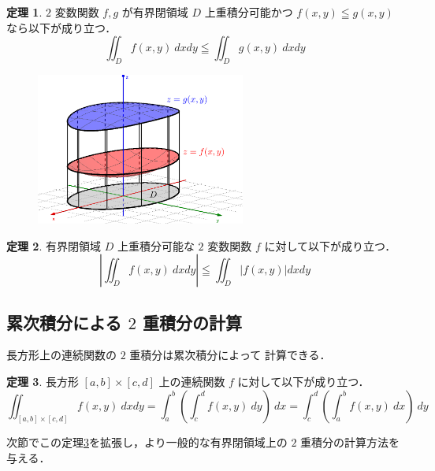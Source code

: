 \documentclass[10pt, uplatex, dvipdfmx]{jsarticle}
\theoremstyle{definition}
\newtheorem{theorem}{定理}[section]
\numberwithin{equation}{section}
\begin{document}
\begin{theorem}\label{thm:additiveD}
  $2$ 変数関数 $f,g$ が有界閉領域 $D$ 上重積分可能かつ $f(x,y) \leqq g(x,y)$ なら以下が成り立つ．
  \[
    \iint_{D} f(x,y) \ dx dy \leqq \iint_{D} g(x,y) \ dx dy
  \]
  \begin{figure}[h]
    \centering
    \includegraphics[height=5cm]{./pictures/07/monotonic.png}
  \end{figure}
\end{theorem}

\begin{theorem}
  有界閉領域 $D$ 上重積分可能な $2$ 変数関数 $f$ に対して以下が成り立つ．
  \[
    \left| \iint_{D} f(x,y) \ dx dy \right| \leqq \iint_{D} \left| f(x,y) \right| dx dy
  \]
\end{theorem}


\newpage

\subsection{累次積分による $2$ 重積分の計算}

長方形上の連続関数の $2$ 重積分は累次積分によって
計算できる．

\begin{theorem}\label{thm:int-on-square}
  長方形 $[a,b] \times [c,d]$ 上の連続関数 $f$ に対して以下が成り立つ．
  \[
    \iint_{[a,b] \times [c,d]} f(x,y) \ dx dy = \int_{a}^{b} \left( \int_{c}^{d} f(x,y) \ dy \right) \ dx
    = \int_{c}^{d} \left( \int_{a}^{b} f(x,y) \ dx \right) \ dy
  \]
\end{theorem}

次節でこの定理\ref{thm:int-on-square}を拡張し，より一般的な有界閉領域上の $2$ 重積分の計算方法を与える．\\
\end{document}
